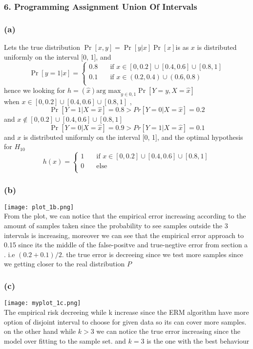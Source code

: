 \documentclass[12pt]{article}
\theoremstyle{plain}
\begin{document}
\subsubsection*{ 6. Programming Assignment Union Of Intervals}
\subsubsection*{(a)}
Lets the true distribution $\Pr[x,y]=\Pr[y|x]\Pr[x]$is as 
$x$ is distributed uniformly on the interval [0, 1], and
\[   
\Pr [y=1|x] = 
     \begin{cases} 
      0.8 &\quad\text{if } x\in [0,0.2]\cup [0.4,0.6]\cup [0.8,1] 
      \\
       0.1  &\quad\text{if     } x\in (0.2,0.4)\cup (0.6,0.8) \\ 
     \end{cases}     
\]
hence we looking for $h=(\hat{x})\text{arg max}_{y\in {0,1}}\Pr[Y=y,X=\hat{x}]$ 
\\ when $x\in [0,0.2]\cup [0.4,0.6]\cup [0.8,1]$ ,\[\Pr[Y=1|X=\hat{x}]=0.8 >Pr[Y=0|X=\hat{x}]=0.2\]
and $x\notin [0,0.2]\cup [0.4,0.6]\cup [0.8,1]$
\[\Pr[Y=0|X=\hat{x}]=0.9 >Pr[Y=1|X=\hat{x}]=0.1\]
and 
$x$ is distributed uniformly on the interval [0, 1], and the optimal hypothesis for $H_{10}$
\[   
h(x)= 
     \begin{cases} 
      1 &\quad\text{if } x\in [0,0.2]\cup [0.4,0.6]\cup [0.8,1] 
      \\
       0  &\quad\text{else} \\ 
     \end{cases}     
\]
\subsubsection*{(b)}
\texttt{[image: plot\_1b.png]}
\\From the plot, we can notice that the empirical error  increasing  according to the amount of samples taken since  the probability to see samples outside the 3 intervals is increasing, moreover we can see that the empirical error  approach to 0.15 since its the middle of the false-positve and true-negtive error from section a . i.e $(0.2+0.1)/2$.
the true error is decreeing since we test more samples since we getting closer to the real distribution $P$
\subsubsection*{(c)}
\texttt{[image: myplot\_1c.png]}\\
The empirical risk decreeing while k increase since the
ERM algorithm have more option of disjoint interval to choose for given data so its can cover more samples.
on the other hand while $k>3$ we can notice the true error increasing since the model over fitting to the sample set.
and $k=3$ is the one with the best behaviour
\end{document}
